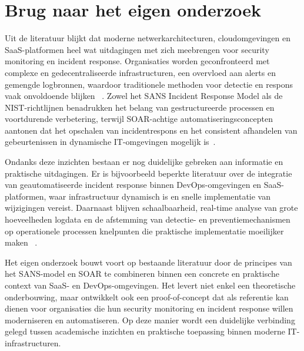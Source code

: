 \section{Brug naar het eigen onderzoek}
Uit de literatuur blijkt dat moderne netwerkarchitecturen, cloudomgevingen en SaaS-platformen heel wat uitdagingen met zich meebrengen voor security monitoring en incident response. Organisaties worden geconfronteerd met complexe en gedecentraliseerde infrastructuren, een overvloed aan alerts en gemengde logbronnen, waardoor traditionele methoden voor detectie en respons vaak onvoldoende blijken ~\autocite{Obregon_2015, Scarfone_Mell_2007, chuvakin2010complete}. Zowel het SANS Incident Response Model als de NIST-richtlijnen benadrukken het belang van gestructureerde processen en voortdurende verbetering, terwijl SOAR-achtige automatiseringsconcepten aantonen dat het opschalen van incidentrespons en het consistent afhandelen van gebeurtenissen in dynamische IT-omgevingen mogelijk is~\autocite{kral2012, s21144759}.  

Ondanks deze inzichten bestaan er nog duidelijke gebreken aan informatie en praktische uitdagingen. Er is bijvoorbeeld beperkte literatuur over de integratie van geautomatiseerde incident response binnen DevOps-omgevingen en SaaS-platformen, waar infrastructuur dynamisch is en snelle implementatie van wijzigingen vereist. Daarnaast blijven schaalbaarheid, real-time analyse van grote hoeveelheden logdata en de afstemming van detectie- en preventiemechanismen op operationele processen knelpunten die praktische implementatie moeilijker maken ~\autocite{raponi2019, cmsf2025012018}.

Het eigen onderzoek bouwt voort op bestaande literatuur door de principes van het SANS-model en SOAR te combineren binnen een concrete en praktische context van SaaS- en DevOps-omgevingen. Het levert niet enkel een theoretische onderbouwing, maar ontwikkelt ook een proof-of-concept dat als referentie kan dienen voor organisaties die hun security monitoring en incident response willen moderniseren en automatiseren. Op deze manier wordt een duidelijke verbinding gelegd tussen academische inzichten en praktische toepassing binnen moderne IT-infrastructuren.